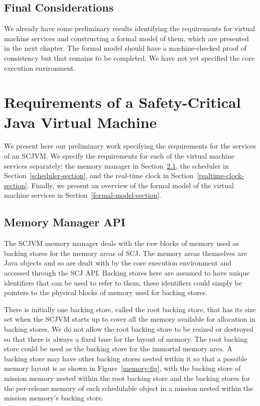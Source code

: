 \documentclass[a4paper,10pt]{report}
\begin{document}
\section{Final Considerations}

We already have some preliminary results identifying the requirements for
virtual machine services and constructing a formal model of them, which are
presented in the next chapter.  The formal model should have a machine-checked
proof of consistency but that remains to be completed.  We have not yet
specified the core execution environment.

\chapter{Requirements of a Safety-Critical Java Virtual Machine}
\label{requirements-chapter}

We present here our preliminary work specifying the requirements for the
services of an SCJVM.  We specify the requirements for each of the virtual
machine services separately: the memory manager in
Section~\ref{memory-manager-section}, the scheduler in
Section~\ref{scheduler-section}, and the real-time clock in
Section~\ref{realtime-clock-section}.  Finally, we present an overview of the
formal model of the virtual machine services in
Section~\ref{formal-model-section}.

\section{Memory Manager API}
\label{memory-manager-section}

The SCJVM memory manager deals with the raw blocks of memory used as backing
stores for the memory areas of SCJ. The memory areas themselves are Java objects
and so are dealt with by the core execution environment and accessed through the
SCJ API. Backing stores here are assumed to have unique identifiers that can be
used to refer to them, these identifiers could simply be pointers to the
physical blocks of memory used for backing stores.

There is initially one backing store, called the root backing store, that has
its size set when the SCJVM starts up to cover all the memory available for
allocation in backing stores. We do not allow the root backing store to be
resized or destroyed so that there is always a fixed base for the layout of 
memory. The root backing store could be used as the backing store for the
immortal memory area. A backing store may have other backing stores nested
within it so that a possible memory layout is as shown in 
Figure~\ref{memory-fig}, with the backing store of mission memory nested within
the root backing store and the backing stores for the per-release memory of each
schedulable object in a mission nested within the mission memory's backing
store.
\end{document}
